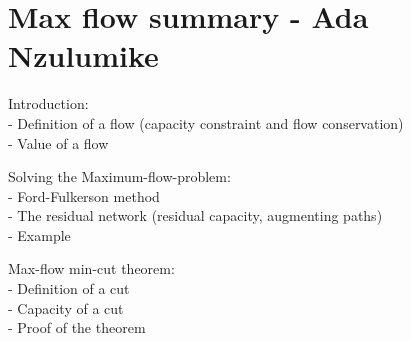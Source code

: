 \section*{Max flow summary - Ada Nzulumike}

Introduction:
\\
- Definition of a flow (capacity constraint and flow conservation)
\\
- Value of a flow

Solving the Maximum-flow-problem:
\\
- Ford-Fulkerson method
\\
- The residual network (residual capacity, augmenting paths)
\\
- Example

Max-flow min-cut theorem:
\\
- Definition of a cut
\\
- Capacity of a cut
\\
- Proof of the theorem